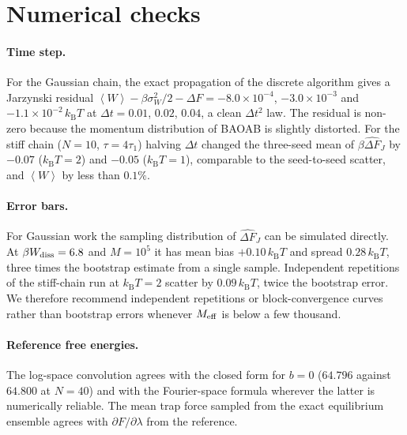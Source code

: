 \documentclass[11pt,a4paper]{article}
\newcommand{\kT}{k_{\mathrm B}T}
\newcommand{\avg}[1]{\left\langle #1\right\rangle}
\newcommand{\Wd}{W_{\rm diss}}
\newcommand{\dFJ}{\widehat{\Delta F}_J}
\begin{document}
\appendix
\section{Numerical checks}
\label{app:checks}

\paragraph{Time step.} For the Gaussian chain, the exact propagation of the discrete algorithm gives a
Jarzynski residual $\avg W-\beta\sigma_W^2/2-\Delta F=-8.0\times10^{-4}$, $-3.0\times10^{-3}$ and
$-1.1\times10^{-2}\,\kT$ at $\Delta t=0.01$, $0.02$, $0.04$, a clean $\Delta t^2$ law. The residual is non-zero
because the momentum distribution of BAOAB is slightly distorted. For the stiff chain ($N=10$, $\tau=4\tau_1$)
halving $\Delta t$ changed the three-seed mean of $\beta\dFJ$ by $-0.07$ ($\kT=2$) and $-0.05$ ($\kT=1$),
comparable to the seed-to-seed scatter, and $\avg W$ by less than $0.1\%$.

\paragraph{Error bars.} For Gaussian work the sampling distribution of $\dFJ$ can be simulated directly. At
$\beta\Wd=6.8$ and $M=10^5$ it has mean bias $+0.10\,\kT$ and spread $0.28\,\kT$, three times the bootstrap
estimate from a single sample. Independent repetitions of the stiff-chain run at $\kT=2$ scatter by $0.09\,\kT$,
twice the bootstrap error. We therefore recommend independent repetitions or block-convergence curves
rather than bootstrap errors whenever $M_{\rm eff}$ is below a few thousand.

\paragraph{Reference free energies.} The log-space convolution agrees with the closed form for $b=0$
($64.796$ against $64.800$ at $N=40$) and with the Fourier-space formula wherever the latter is numerically
reliable. The mean trap force sampled from the exact equilibrium ensemble agrees with $\partial F/\partial\lambda$
from the reference.
\end{document}
